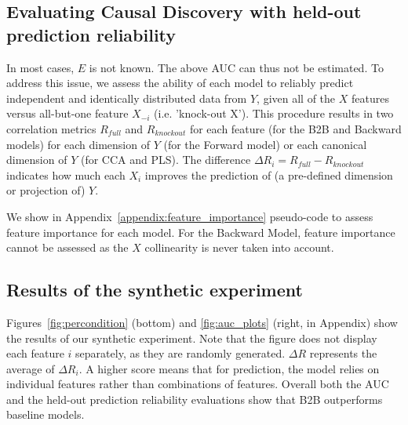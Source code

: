 \subsection{Evaluating Causal Discovery with held-out prediction reliability}

In most cases, $E$ is not known. The above AUC can thus not be estimated.
To address this issue, we assess the ability of each model to reliably predict
independent and identically distributed data from $Y$, given all of the $X$
features versus all-but-one feature $X_{-i}$ (i.e. 'knock-out X'). This
procedure results in two correlation metrics $R_{full}$ and $R_{knockout}$ for
each feature (for the B2B and Backward models) for each dimension of $Y$ (for
the Forward model) or each canonical dimension of $Y$ (for CCA and PLS). The
difference $\Delta R_i = R_{full}-R_{knockout}$ indicates how much each
$X_i$ improves the prediction of (a pre-defined dimension or projection of) $Y$.

We show in Appendix~\ref{appendix:feature_importance} pseudo-code to assess
feature importance for each model. For the Backward Model, feature importance
cannot be assessed as the $X$ collinearity is never
taken into account.

\subsection{Results of the synthetic experiment}

Figures~\ref{fig:percondition} (bottom) and \ref{fig:auc_plots} (right, in
Appendix) show the results of our synthetic experiment. Note that the figure
does not display each feature $i$ separately, as they are
randomly generated. $\Delta R$ represents the average of $\Delta R_i$. A
higher score means that for prediction, the model relies on individual features
rather than combinations of features. Overall both the AUC and the held-out
prediction reliability evaluations show that B2B outperforms baseline models.
